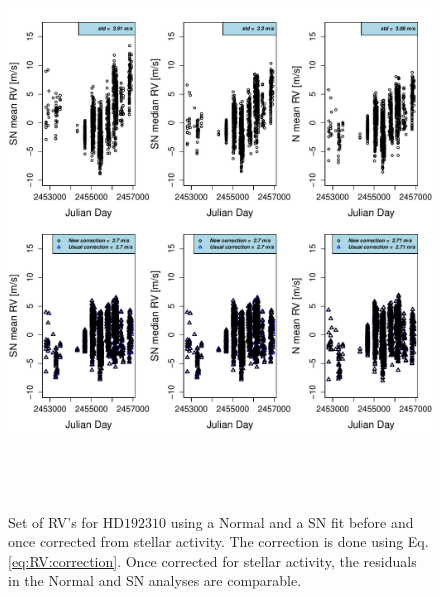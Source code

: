 \documentclass{aa}
\begin{document}
\begin{figure} 
\begin{center}
\includegraphics[height = 6in]{NEW_CORRECTIONHD19231_[3]CorrectionActivity_RadialVelocity_vs_time.pdf} 
   \caption{Set of RV's for $\text{HD}192310$  using a Normal and a SN fit before and once corrected from stellar activity. The correction is done using Eq. \ref{eq:RV:correction}. Once corrected for stellar activity, the residuals in the Normal and SN analyses are comparable.}
   \label{fig:HD192310:correctionRV}
\end{center}
\end{figure}
\end{document}
